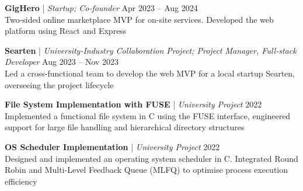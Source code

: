 \documentclass[10pt, a4paper]{article}
\newcommand{\ExperienceEntry}[4]{
  \noindent \textbf{#1} | \textit{#3} \hfill #2 \\
  {\small #4} \par
  \vspace{4pt}
}
\begin{document}
\ExperienceEntry{GigHero}{Apr 2023 -- Aug 2024}
{Startup; Co-founder}
{Two-sided online marketplace MVP for on-site services. Developed the web platform using React and Express}

\ExperienceEntry{Searten}{Aug 2023 -- Nov 2023}
{University-Industry Collaboration Project; Project Manager, Full-stack Developer}
{Led a cross-functional team to develop the web MVP for a local startup Searten, overseeing the project lifecycle}

\ExperienceEntry{File System Implementation with FUSE}{2022}
{University Project}
{Implemented a functional file system in C using the FUSE interface, 
engineered support for large file handling and hierarchical directory structures}

\ExperienceEntry{OS Scheduler Implementation}{2022}
{University Project}
{Designed and implemented an operating system scheduler in C.
Integrated Round Robin and Multi-Level Feedback Queue (MLFQ) to optimise process execution efficiency}
\end{document}
